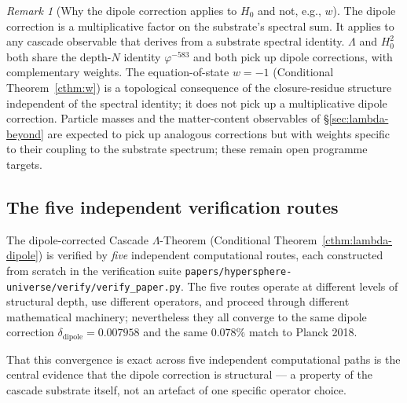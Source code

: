 \documentclass[11pt]{article}
\theoremstyle{plain}
\theoremstyle{definition}
\theoremstyle{remark}
\newtheorem{remark}[theorem]{Remark}
\begin{document}
\begin{remark}[Why the dipole correction applies to $H_0$ and not, e.g., $w$]\label{rem:dipole-applies}
The dipole correction is a multiplicative factor on the substrate's spectral sum. It applies to any cascade observable that derives from a substrate spectral identity. $\Lambda$ and $H_0^2$ both share the depth-$N$ identity $\varphi^{-583}$ and both pick up dipole corrections, with complementary weights. The equation-of-state $w = -1$ (Conditional Theorem~\ref{cthm:w}) is a topological consequence of the closure-residue structure independent of the spectral identity; it does not pick up a multiplicative dipole correction. Particle masses and the matter-content observables of \S\ref{sec:lambda-beyond} are expected to pick up analogous corrections but with weights specific to their coupling to the substrate spectrum; these remain open programme targets.
\end{remark}

\subsection{The five independent verification routes}\label{sec:lambda-five-routes}

The dipole-corrected Cascade $\Lambda$-Theorem (Conditional Theorem~\ref{cthm:lambda-dipole}) is verified by \emph{five} independent computational routes, each constructed from scratch in the verification suite \texttt{papers/hypersphere-universe/verify/verify\_paper.py}. The five routes operate at different levels of structural depth, use different operators, and proceed through different mathematical machinery; nevertheless they all converge to the same dipole correction $\delta_\mathrm{dipole} = 0.007958$ and the same $0.078\%$ match to Planck 2018.

That this convergence is exact across five independent computational paths is the central evidence that the dipole correction is structural --- a property of the cascade substrate itself, not an artefact of one specific operator choice.
\end{document}
